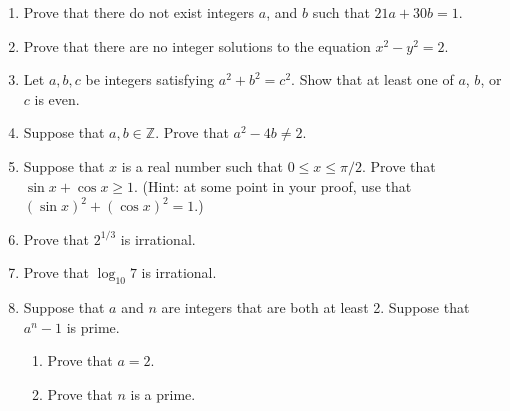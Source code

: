 \begin{enumerate}
\item Prove that there do not exist integers $a$, and $b$ such that $21a + 30b = 1$.
\item Prove that there are no integer solutions to the equation $x^2 - y^2 = 2$.
\item Let $a, b, c$ be integers satisfying $a^2 + b^2 = c^2$. Show that at least one of $a$, $b$, or $c$ is even. %
\item Suppose that $a,b \in \mathbb{Z}$. Prove that $a^2 - 4b \neq 2$.
\item Suppose that $x$ is a real number such that $0 \leq x \leq \pi/2$. Prove that $\sin x + \cos x \geq 1$. (Hint: at some point in your proof, use that $(\sin x)^2 + (\cos x)^2 = 1$.)
\item Prove that $2^{1/3}$ is irrational.
\item Prove that $\log_{10} 7$ is irrational.
\item Suppose that $a$ and $n$ are integers that are both at least 2. Suppose that $a^n -1$ is prime.
  
  \begin{enumerate}
   \item Prove that $a = 2$.
   \item Prove that $n$ is a prime. %
  \end{enumerate}

\end{enumerate}

